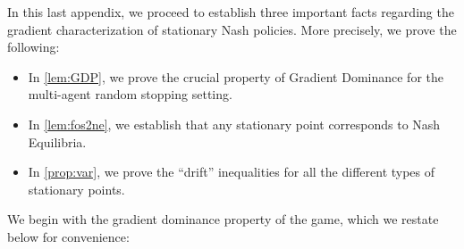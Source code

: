 


In this last appendix, we proceed to establish three important facts regarding the gradient characterization of stationary Nash policies.
More precisely, we prove the following:
\begin{itemize}
\item
In \cref{lem:GDP}, we prove the crucial property of Gradient Dominance for the multi-agent random stopping setting.
\item
In \cref{lem:fos2ne}, we establish that any stationary point corresponds to Nash Equilibria.
\item
In \cref{prop:var}, we prove the ``drift'' inequalities for all the different types of stationary points. 
\end{itemize}

We begin with the gradient dominance property of the game, which we restate below for convenience:

\GradientDominance*

